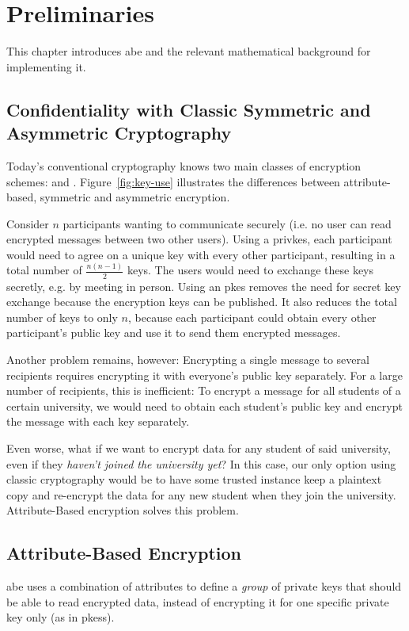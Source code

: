\chapter{Preliminaries}\label{chapter:background}
This chapter introduces \acrlong{abe} and the relevant mathematical background for implementing it.



\section{Confidentiality with Classic Symmetric and Asymmetric Cryptography}
Today's conventional cryptography knows two main classes of encryption schemes:  and .
Figure~\ref{fig:key-use} illustrates the differences between attribute-based, symmetric and asymmetric encryption.

Consider $n$ participants wanting to communicate securely (i.e. no user can read encrypted messages between two other users).
Using a \gls{privkes}, each participant would need to agree on a unique key with every other participant, resulting in a total number of $\frac{n(n-1)}{2}$ keys.
The users would need to exchange these keys secretly, e.g. by meeting in person.
Using an \gls{pkes} removes the need for secret key exchange because the encryption keys can be published.
It also reduces the total number of keys to only $n$, because each participant could obtain every other participant's public key and use it to send them encrypted messages.

Another problem remains, however: Encrypting a single message to several recipients requires encrypting it with everyone's public key separately.
For a large number of recipients, this is inefficient:
To encrypt a message for all students of a certain university, we would need to obtain each student's public key and encrypt the message with each key separately.

Even worse, what if we want to encrypt data for any student of said university, even if they \emph{haven't joined the university yet}?
In this case, our only option using classic cryptography would be to have some trusted instance keep a plaintext copy and re-encrypt the data for any new student when they join the university.
Attribute-Based encryption solves this problem.

\section{Attribute-Based Encryption}\label{sec:background-abe}
\acrfull{abe} uses a combination of attributes to define a \emph{group} of private keys that should be able to read encrypted data, instead of encrypting it for one specific private key only (as in \glspl{pkes}).

